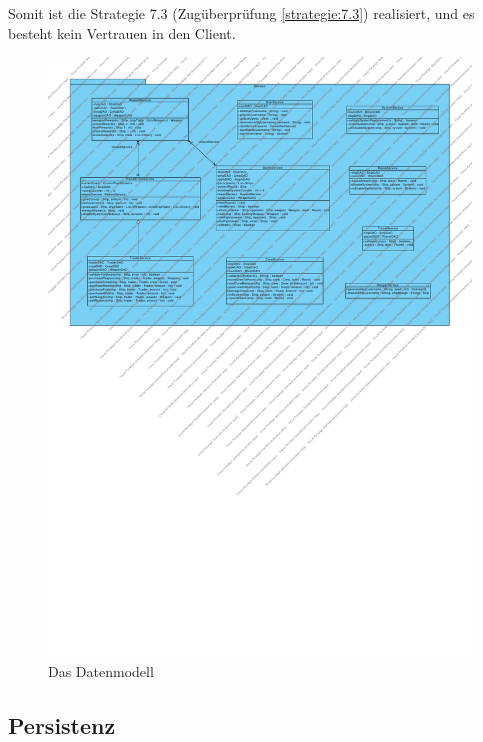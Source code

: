 \documentclass[fontsize=12pt,paper=a4,twoside]{scrartcl}
\begin{document}
Somit ist die Strategie 7.3 (Zugüberprüfung \ref{strategie:7.3}) realisiert, und es besteht kein Vertrauen in den Client.

\begin{figure}[H]
\begin{center}
  \includegraphics[width=\linewidth]{../GT_Modulsicht/src/Service.pdf}
    \caption{Das Datenmodell}
\end{center}
\end{figure}

\subsection{Persistenz}
\end{document}
